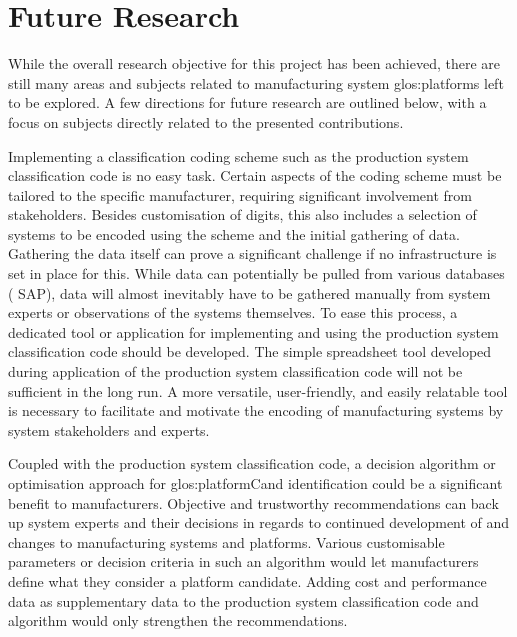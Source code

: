 \section{Future Research}
While the overall research objective for this \PhD{} project has been achieved, there are still many areas and subjects related to manufacturing system \gls{glos:platform}s left to be explored.
A few directions for future research are outlined below, with a focus on subjects directly related to the presented contributions.

Implementing a classification coding scheme such as the production system classification code is no easy task.
Certain aspects of the coding scheme must be tailored to the specific manufacturer, requiring significant involvement from stakeholders.
Besides customisation of digits, this also includes a selection of systems to be encoded using the scheme and the initial gathering of data.
Gathering the data itself can prove a significant challenge if no infrastructure is set in place for this. 
While data can potentially be pulled from various databases (\eg{} SAP), data will almost inevitably have to be gathered manually from system experts or observations of the systems themselves.
To ease this process, a dedicated tool or application for implementing and using the production system classification code should be developed.
The simple spreadsheet tool developed during application of the production system classification code will not be sufficient in the long run.
A more versatile, user-friendly, and easily relatable tool is necessary to facilitate and motivate the encoding of manufacturing systems by system stakeholders and experts.

Coupled with the production system classification code, a decision algorithm or optimisation approach for \gls{glos:platformCand} identification could be a significant benefit to manufacturers.
Objective and trustworthy recommendations can back up system experts and their decisions in regards to continued development of and changes to manufacturing systems and platforms.
Various customisable parameters or decision criteria in such an algorithm would let manufacturers define what they consider a platform candidate.
Adding cost and performance data as supplementary data to the production system classification code and algorithm would only strengthen the recommendations.


